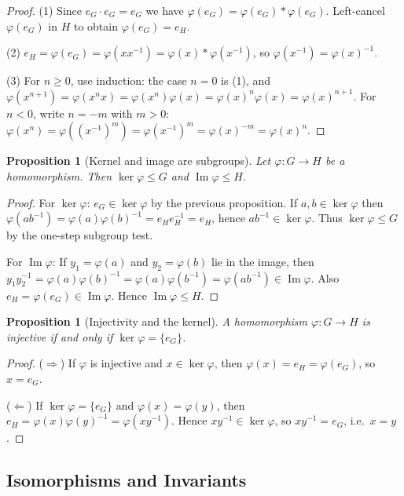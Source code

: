 \documentclass[12pt]{article}
\newtheorem{proposition}[theorem]{Proposition}
\theoremstyle{definition}
\begin{document}
\begin{proof}
(1) Since $e_G\cdot e_G=e_G$ we have $\varphi(e_G)=\varphi(e_G)\ast\varphi(e_G)$.
Left-cancel $\varphi(e_G)$ in $H$ to obtain $\varphi(e_G)=e_H$.

(2) $e_H=\varphi(e_G)=\varphi(xx^{-1})=\varphi(x)\ast\varphi(x^{-1})$,
so $\varphi(x^{-1})=\varphi(x)^{-1}$.

(3) For $n\ge 0$, use induction: the case $n=0$ is (1), and
$\varphi(x^{n+1})=\varphi(x^n x)=\varphi(x^n)\varphi(x)=\varphi(x)^n\varphi(x)=\varphi(x)^{n+1}$.
For $n<0$, write $n=-m$ with $m>0$:
$\varphi(x^n)=\varphi((x^{-1})^m)=\varphi(x^{-1})^m=\varphi(x)^{-m}=\varphi(x)^n$.
\end{proof}

\begin{proposition}[Kernel and image are subgroups]
Let $\varphi:G\to H$ be a homomorphism. Then $\ker\varphi\le G$ and $\operatorname{Im}\varphi\le H$.
\end{proposition}

\begin{proof}
For $\ker\varphi$: $e_G\in\ker\varphi$ by the previous proposition. If $a,b\in\ker\varphi$ then
$\varphi(ab^{-1})=\varphi(a)\varphi(b)^{-1}=e_H e_H^{-1}=e_H$, hence $ab^{-1}\in\ker\varphi$.
Thus $\ker\varphi\le G$ by the one-step subgroup test.

For $\operatorname{Im}\varphi$: If $y_1=\varphi(a)$ and $y_2=\varphi(b)$ lie in the image, then
$y_1y_2^{-1}=\varphi(a)\varphi(b)^{-1}=\varphi(a)\varphi(b^{-1})=\varphi(ab^{-1})\in\operatorname{Im}\varphi$.
Also $e_H=\varphi(e_G)\in\operatorname{Im}\varphi$. Hence $\operatorname{Im}\varphi\le H$.
\end{proof}

\begin{proposition}[Injectivity and the kernel]
A homomorphism $\varphi:G\to H$ is injective if and only if $\ker\varphi=\{e_G\}$.
\end{proposition}

\begin{proof}
($\Rightarrow$) If $\varphi$ is injective and $x\in\ker\varphi$, then $\varphi(x)=e_H=\varphi(e_G)$, so $x=e_G$.

($\Leftarrow$) If $\ker\varphi=\{e_G\}$ and $\varphi(x)=\varphi(y)$, then
$e_H=\varphi(x)\varphi(y)^{-1}=\varphi(xy^{-1})$. Hence $xy^{-1}\in\ker\varphi$, so $xy^{-1}=e_G$, i.e.\ $x=y$.
\end{proof}

\subsection*{Isomorphisms and Invariants}
\end{document}

